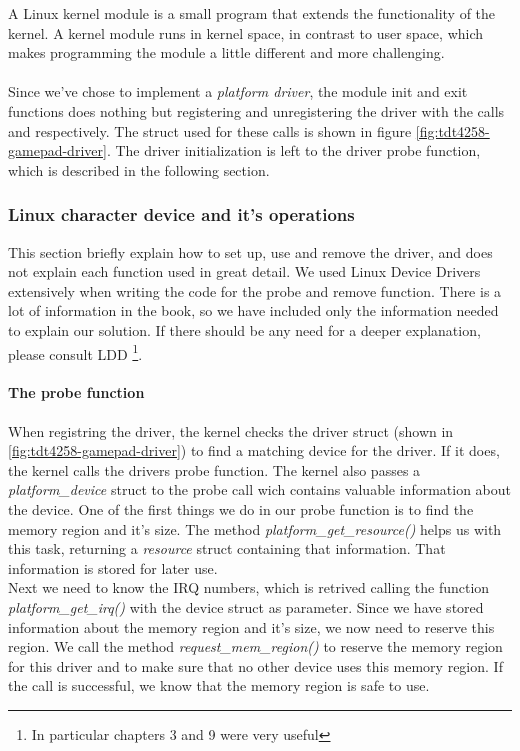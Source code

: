 A Linux kernel module is a small program that extends the functionality of the kernel. A kernel module runs in kernel space, in contrast to user space, which makes programming the module a little different and more challenging.\\
\\
Since we've chose to implement a \emph{platform driver}, the module init and exit functions does nothing but registering and unregistering the driver with the calls  and  respectively. The struct used for these calls is shown in figure \ref{fig:tdt4258-gamepad-driver}. The driver initialization is left to the driver probe function, which is described in the following section. 

\subsubsection{Linux character device and it's operations}

This section briefly explain how to set up, use and remove the driver, and does not explain each function used in great detail. We used Linux Device Drivers extensively when writing the code for the probe and remove function. There is a lot of information in the book, so we have included only the information needed to explain our solution. If there should be any need for a deeper explanation, please consult LDD \footnote{In particular chapters 3 and 9 were very useful}.   

\paragraph{The probe function} 

When registring the driver, the kernel checks the driver struct (shown in \ref{fig:tdt4258-gamepad-driver}) to find a matching device for the driver. If it does, the kernel calls the drivers probe function. The kernel also passes a \emph{platform\_device} struct to the probe call wich contains valuable information about the device. One of the first things we do in our probe function is to find the memory region and it's size. The method \emph{platform\_get\_resource()} helps us with this task, returning a \emph{resource} struct containing that information. That information is stored for later use. \\

Next we need to know the IRQ numbers, which is retrived calling the function \emph{platform\_get\_irq()} with the device struct as parameter. Since we have stored information about the memory region and it's size, we now need to reserve this region. We call the method \emph{request\_mem\_region()} to reserve the memory region for this driver and to make sure that no other device uses this memory region. If the call is successful, we know that the memory region is safe to use.  \\

